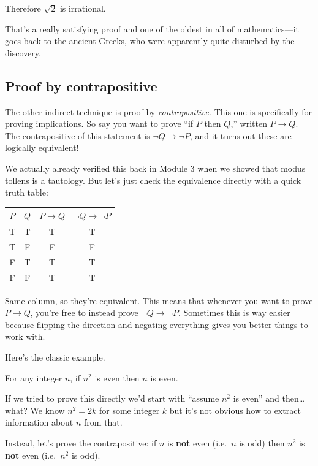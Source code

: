 \documentclass[11pt]{article}
\begin{document}
Therefore $\sqrt{2}$ is irrational.

That's a really satisfying proof and one of the oldest in all of mathematics---it goes back to the ancient Greeks, who were apparently quite disturbed by the discovery.

\subsection{Proof by contrapositive}
The other indirect technique is proof by \emph{contrapositive}. This one is specifically for proving implications. So say you want to prove ``if $P$ then $Q$,'' written $P \to Q$. The contrapositive of this statement is $\lnot Q \to \lnot P$, and it turns out these are logically equivalent!

We actually already verified this back in Module 3 when we showed that modus tollens is a tautology. But let's just check the equivalence directly with a quick truth table:

\begin{center}
\begin{tabular}{cc|c|c}
\toprule
$P$ & $Q$ & $P \to Q$ & $\lnot Q \to \lnot P$ \\
\midrule
T & T & T & T \\
T & F & F & F \\
F & T & T & T \\
F & F & T & T \\
\bottomrule
\end{tabular}
\end{center}

Same column, so they're equivalent. This means that whenever you want to prove $P \to Q$, you're free to instead prove $\lnot Q \to \lnot P$. Sometimes this is way easier because flipping the direction and negating everything gives you better things to work with.

Here's the classic example.

\begin{theorem}
For any integer $n$, if $n^2$ is even then $n$ is even.
\end{theorem}

If we tried to prove this directly we'd start with ``assume $n^2$ is even'' and then\ldots what? We know $n^2 = 2k$ for some integer $k$ but it's not obvious how to extract information about $n$ from that.

Instead, let's prove the contrapositive: if $n$ is \textbf{not} even (i.e.\ $n$ is odd) then $n^2$ is \textbf{not} even (i.e.\ $n^2$ is odd).
\end{document}
